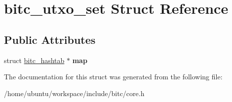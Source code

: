 \hypertarget{structbitc__utxo__set}{\section{bitc\-\_\-utxo\-\_\-set Struct Reference}
\label{structbitc__utxo__set}
}
\subsection*{Public Attributes}
\begin{DoxyCompactItemize}
\item 
\hypertarget{structbitc__utxo__set_a54897ecd8b9f53cbd72c11cabc841d71}{struct \hyperlink{structbitc__hashtab}{bitc\-\_\-hashtab} $\ast$ {\bfseries map}}\label{structbitc__utxo__set_a54897ecd8b9f53cbd72c11cabc841d71}

\end{DoxyCompactItemize}


The documentation for this struct was generated from the following file\-:\begin{DoxyCompactItemize}
\item 
/home/ubuntu/workspace/include/bitc/core.\-h\end{DoxyCompactItemize}
